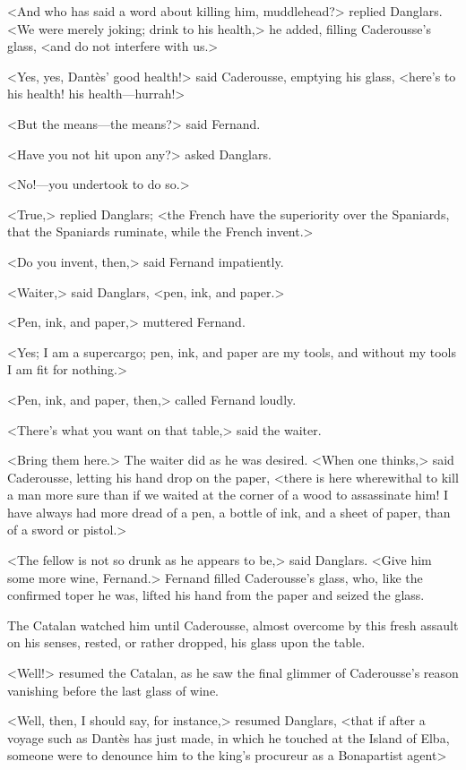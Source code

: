  <And who has said a word about killing him, muddlehead?> replied Danglars. <We were merely joking; drink to his health,> he added, filling Caderousse's glass, <and do not interfere with us.> 

 <Yes, yes, Dantès' good health!> said Caderousse, emptying his glass, <here's to his health! his health—hurrah!> 

 <But the means—the means?> said Fernand. 

 <Have you not hit upon any?> asked Danglars. 

 <No!—you undertook to do so.> 

 <True,> replied Danglars; <the French have the superiority over the Spaniards, that the Spaniards ruminate, while the French invent.> 

 <Do you invent, then,> said Fernand impatiently. 

 <Waiter,> said Danglars, <pen, ink, and paper.> 

 <Pen, ink, and paper,> muttered Fernand. 

 <Yes; I am a supercargo; pen, ink, and paper are my tools, and without my tools I am fit for nothing.> 

 <Pen, ink, and paper, then,> called Fernand loudly. 

 <There's what you want on that table,> said the waiter. 

 <Bring them here.> The waiter did as he was desired.  <When one thinks,> said Caderousse, letting his hand drop on the paper, <there is here wherewithal to kill a man more sure than if we waited at the corner of a wood to assassinate him! I have always had more dread of a pen, a bottle of ink, and a sheet of paper, than of a sword or pistol.> 

 <The fellow is not so drunk as he appears to be,> said Danglars. <Give him some more wine, Fernand.> Fernand filled Caderousse's glass, who, like the confirmed toper he was, lifted his hand from the paper and seized the glass. 

 The Catalan watched him until Caderousse, almost overcome by this fresh assault on his senses, rested, or rather dropped, his glass upon the table. 

 <Well!> resumed the Catalan, as he saw the final glimmer of Caderousse's reason vanishing before the last glass of wine. 

 <Well, then, I should say, for instance,> resumed Danglars, <that if after a voyage such as Dantès has just made, in which he touched at the Island of Elba, someone were to denounce him to the king's procureur as a Bonapartist agent\longdash> 

